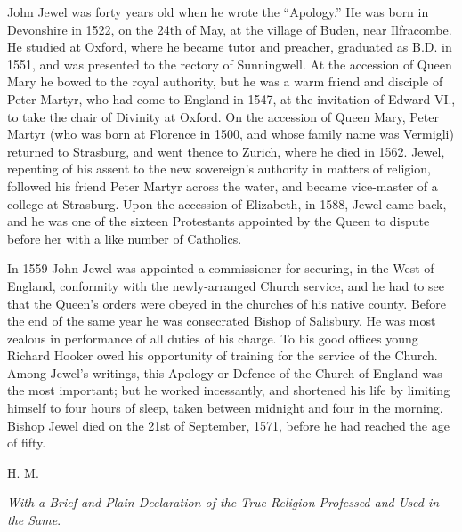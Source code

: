 John Jewel was forty years old when he wrote the “Apology.”
He was born in Devonshire in 1522, on the 24th of May, at the village
of Buden, near Ilfracombe. He studied at Oxford, where he became
tutor and preacher, graduated as B.D. in 1551, and was presented to
the rectory of Sunningwell. At the accession of Queen Mary he
bowed to the royal authority, but he was a warm friend and disciple
of Peter Martyr, who had come to England in 1547, at the invitation
of Edward VI., to take the chair of Divinity at Oxford. On the
accession of Queen Mary, Peter Martyr (who was born at Florence in 1500,
and whose family name was Vermigli) returned to Strasburg, and went
thence to Zurich, where he died in 1562. Jewel, repenting of his
assent to the new sovereign’s authority in matters of religion,
followed his friend Peter Martyr across the water, and became vice-master
of a college at Strasburg. Upon the accession of Elizabeth, in
1588, Jewel came back, and he was one of the sixteen Protestants appointed
by the Queen to dispute before her with a like number of Catholics.

In 1559 John Jewel was appointed a commissioner for securing, in
the West of England, conformity
with the newly-arranged Church service, and he had to see that the Queen’s
orders were obeyed in the churches of his native county. Before
the end of the same year he was consecrated Bishop of Salisbury.
He was most zealous in performance of all duties of his charge.
To his good offices young Richard Hooker owed his opportunity of training
for the service of the Church. Among Jewel’s writings, this
Apology or Defence of the Church of England was the most important;
but he worked incessantly, and shortened his life by limiting himself
to four hours of sleep, taken between midnight and four in the morning.
Bishop Jewel died on the 21st of September, 1571, before he had reached
the age of fifty.

H. M.


\emph{With a Brief and Plain Declaration of the True Religion Professed
and Used in the Same}.


